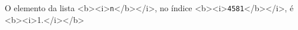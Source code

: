 \documentclass[12pt,varwidth=16cm,border=1pt]{standalone}
\begin{document}
 
 
O elemento da lista <b><i>\verb+n+</b></i>, no índice <b><i>\verb+4581+</b></i>, é <b><i>1.</i></b> 
 
\questiomtrue 
 
\end{document}
